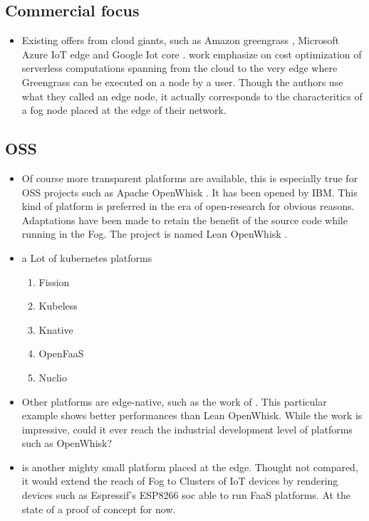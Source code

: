 \documentclass[11pt]{sdm}
\begin{document}
\subsection{Commercial focus}
\begin{itemize}
    \item Existing offers from cloud giants, such as Amazon greengrass \cite{noauthor_aws_nodate}, Microsoft Azure IoT edge \cite{noauthor_iot_nodate} and Google Iot core \cite{noauthor_cloud_nodate}.  work emphasize on cost optimization of serverless computations spanning from the cloud to the very edge where Greengrass can be executed on a node by a user. Though the authors use what they called an edge node, it actually corresponds to the characteritics of a fog node placed at the edge of their network.
    
\end{itemize}

\hypersetup{linkcolor=}
\subsection{\acrfull{OSS}}
\begin{itemize}
    \item Of course more transparent platforms are available, this is especially true for \gls{OSS} projects such as Apache OpenWhisk \cite{noauthor_apache_nodate}. It has been opened by IBM. This kind of platform is preferred in the era of open-research for obvious reasons. Adaptations have been made to retain the benefit of the source code while running in the Fog. The project is named Lean OpenWhisk \cite{breitgand_lean_2018}.
    \item a Lot of kubernetes platforms \begin{enumerate}
        \item Fission
        \item Kubeless
        \item Knative
        \item OpenFaaS
        \item Nuclio
    \end{enumerate}
    \item Other platforms are edge-native, such as the work of \citet{pfandzelter_tinyfaas_2020}. This particular example shows better performances than Lean OpenWhisk. While the work is impressive, could it ever reach the industrial development level of platforms such as OpenWhisk?
    \item \cite{george_nanolambda_2020} is another mighty small platform placed at the edge. Thought not compared, it would extend the reach of Fog to Clusters of IoT devices by rendering devices such as Espressif's ESP8266 soc \cite{noauthor_esp8266_nodate} able to run \gls{FaaS} platforms. At the state of a proof of concept for now.
\end{itemize}
\end{document}

